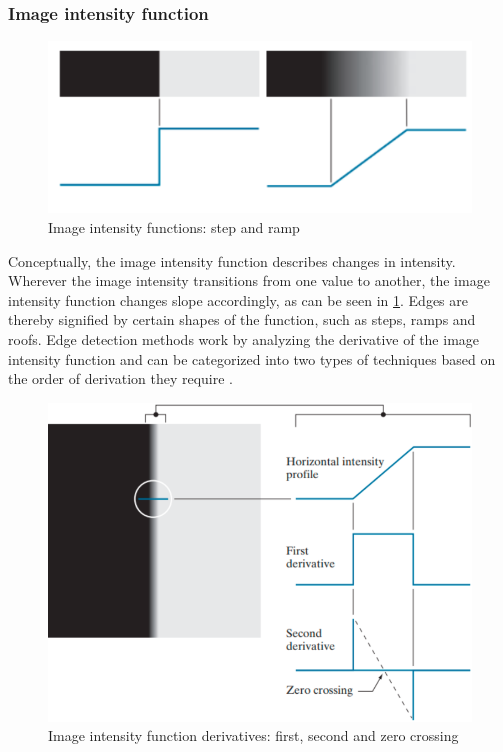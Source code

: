 \subsubsection*{Image intensity function}
\begin{figure}[h]
	\centerline{\includegraphics[scale=0.5]{images/edgeModel.png}}
	\caption{Image intensity functions: step and ramp \cite{gonzalezDigitalImageProcessing2007}}\label{fig:iif}
\end{figure}
\noindent
Conceptually, the image intensity function describes changes in intensity.
Wherever the image intensity transitions from one value to another,
the image intensity function changes slope accordingly, as can be seen in \cref{fig:iif}.
Edges are thereby signified by certain shapes of the function, such as steps, ramps and roofs.
Edge detection methods work by analyzing the derivative of the image intensity function and
can be categorized into two types of techniques based on the order of derivation they require \cite{gonzalezDigitalImageProcessing2007}.
\begin{figure}[h]
	\centerline{\includegraphics[scale=0.5]{images/edgeModelOrders.png}}
	\caption{Image intensity function derivatives: first, second and zero crossing \cite{gonzalezDigitalImageProcessing2007}}\label{fig:iifO}
\end{figure}
\noindent


